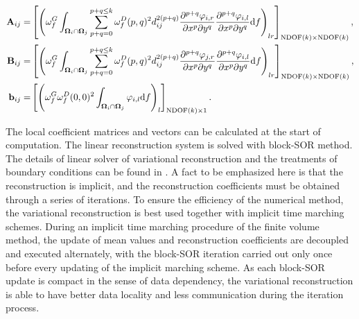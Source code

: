 \begin{equation}
    \label{eq:vrCoeffs}
    \begin{aligned}
        \mathbf{A}_{ij} = &
        \left[
            \left({
                \omega_f^G\int_{\OO_i \cap \OO_j}{
                    \sum_{p+q=0}^{p + q\leq k}
                    \omega_f^D(p,q)^2
                    d_{ij}^{2(p+q)}
                    \partialderivative{^{p+q}\varphi_{i,r}}{x^p\partial y^q}
                    \partialderivative{^{p+q}\varphi_{i,l}}{x^p\partial y^q}
                    \dd f}
            }\right)_{lr}
        \right]_{\mathrm{NDOF}(k) \times \mathrm{NDOF}(k)}, \\
        \mathbf{B}_{ij}=  &
        \left[
            \left({
                \omega_f^G\int_{\OO_i \cap \OO_j}{
                    \sum_{p+q=0}^{p + q\leq k}
                    \omega_f^D(p,q)^2
                    d_{ij}^{2(p+q)}
                    \partialderivative{^{p+q}\varphi_{j,r}}{x^p\partial y^q}
                    \partialderivative{^{p+q}\varphi_{i,l}}{x^p\partial y^q}
                    \dd f}
            }\right)_{lr}
        \right]_{\mathrm{NDOF}(k) \times \mathrm{NDOF}(k)}, \\
        \mathbf{b}_{ij}=  &
        \left[
            \left({
                    \omega_f^G\omega_f^D(0,0)^2
                    \int_{\OO_i \cap \OO_j}{
                        \varphi_{i,l}
                        \dd f}
                }\right)_{l}
        \right]_{\mathrm{NDOF}(k) \times 1}.                \\
    \end{aligned}
\end{equation}

The local coefficient matrices and vectors  can be
calculated at the start of computation.
The linear reconstruction system 
is solved with block-SOR method.
The details of linear solver of variational reconstruction and the treatments of
boundary conditions can be found in \cite{wang2017compact_VR}.
A fact to be emphasized here is that
the reconstruction is implicit, and
the reconstruction coefficients must be
obtained through a series of
iterations.
To ensure the efficiency of the numerical method,
the variational reconstruction is best used
together with implicit time marching schemes.
During an implicit time marching procedure of the finite volume method,
the update of mean values and reconstruction
coefficients are decoupled
and executed alternately, with the block-SOR
iteration carried out only once before every updating
of the implicit marching scheme.
As each block-SOR update is compact in the sense of data dependency,
the variational reconstruction is able to have better data locality and
less communication during the iteration process.



